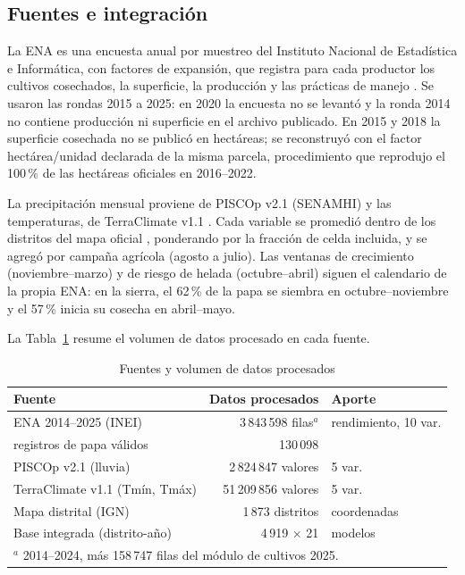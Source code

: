 \documentclass[conference,letterpaper]{IEEEtran}
\begin{document}
\subsection{Fuentes e integración}
La ENA es una encuesta anual por muestreo del Instituto Nacional de Estadística e Informática, con factores de expansión, que registra para cada productor los cultivos cosechados, la superficie, la producción y las prácticas de manejo \cite{inei_ena}. Se usaron las rondas 2015 a 2025: en 2020 la encuesta no se levantó y la ronda 2014 no contiene producción ni superficie en el archivo publicado. En 2015 y 2018 la superficie cosechada no se publicó en hectáreas; se reconstruyó con el factor hectárea/unidad declarada de la misma parcela, procedimiento que reprodujo el 100\,\% de las hectáreas oficiales en 2016--2022.

La precipitación mensual proviene de PISCOp v2.1 (SENAMHI) \cite{aybar2020,senamhi_piscop} y las temperaturas, de TerraClimate v1.1 \cite{abatzoglou2018,terraclimate_v11}. Cada variable se promedió dentro de los distritos del mapa oficial \cite{hdx_codab}, ponderando por la fracción de celda incluida, y se agregó por campaña agrícola (agosto a julio). Las ventanas de crecimiento (noviembre--marzo) y de riesgo de helada (octubre--abril) siguen el calendario de la propia ENA: en la sierra, el 62\,\% de la papa se siembra en octubre--noviembre y el 57\,\% inicia su cosecha en abril--mayo.

La Tabla~\ref{tab:fuentes} resume el volumen de datos procesado en cada fuente.

\begin{table}[!t]
\caption{Fuentes y volumen de datos procesados}
\label{tab:fuentes}
\centering
\footnotesize
\setlength{\tabcolsep}{2.4pt}
\begin{tabular}{lrl}
\toprule
Fuente & Datos procesados & Aporte \\
\midrule
ENA 2014--2025 (INEI) & 3\,843\,598 filas$^{a}$ & rendimiento, 10 var. \\
\quad registros de papa válidos & 130\,098 & \\
PISCOp v2.1 (lluvia) & 2\,824\,847 valores & 5 var. \\
TerraClimate v1.1 (Tmín, Tmáx) & 51\,209\,856 valores & 5 var. \\
Mapa distrital (IGN) & 1\,873 distritos & coordenadas \\
\midrule
Base integrada (distrito-año) & 4\,919 $\times$ 21 & modelos \\
\bottomrule
\multicolumn{3}{l}{\scriptsize $^{a}$ 2014--2024, más 158\,747 filas del módulo de cultivos 2025.} \\
\end{tabular}
\end{table}
\end{document}
